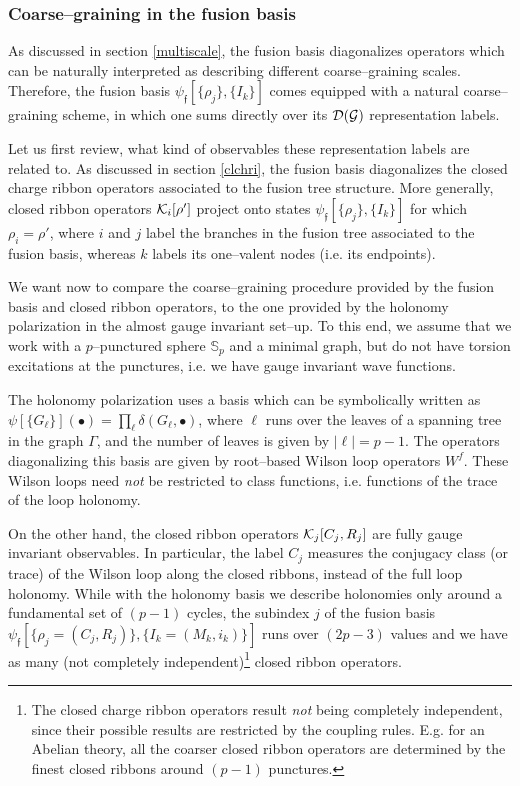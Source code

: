 \documentclass[nofootinbib,superscriptaddress,eqsecnum,tightenlines,11pt]{revtex4-1}
\def\mG{\mathcal{G}}
\renewcommand{\S}{{\mathbb S}}
\begin{document}
\subsubsection{Coarse--graining in the fusion basis}

 As discussed in section \ref{multiscale}, the fusion basis diagonalizes operators which can be naturally interpreted as describing different coarse--graining scales. 
Therefore, the fusion basis $\psi_{\mathfrak{f}}[\{\rho_j\},\{I_k\}]$ comes equipped with a natural coarse--graining scheme, in which one sums directly over its ${\cal D}(\mG)$ representation labels.

Let us first review, what kind of observables these representation labels are related to.  
As discussed in section \ref{clchri}, the fusion basis diagonalizes the closed charge ribbon operators associated to the fusion tree structure.
More generally, closed ribbon operators ${\cal K}_i[\rho']$ project onto states $\psi_{\mathfrak{f}}[\{\rho_j\},\{I_k\}]$ for which $\rho_i=\rho'$, where $i$ and $j$ label the branches in the fusion tree associated to the fusion basis, whereas $k$ labels its one--valent nodes (i.e. its endpoints).
 
We want now to compare the coarse--graining procedure provided by the fusion basis and closed ribbon operators, to the one provided by the holonomy polarization in the almost gauge invariant set--up.  
To this end, we assume that we work with a $p$--punctured sphere $\S_p$ and a minimal graph, but do not have torsion excitations at the punctures, i.e. we have gauge invariant wave functions. 

The holonomy polarization uses a basis which can be symbolically written as $\psi[\{G_\ell\}](\bullet)= \prod_\ell \delta(G_\ell, \bullet)$, where $\ell$ runs over the leaves of a spanning tree in the graph $\Gamma$, and the number of leaves is given by $|\ell|=p-1$.  
The operators diagonalizing this basis are given by root--based Wilson loop operators $W^f$.
These Wilson loops need \textit{not} be restricted to class functions, i.e. functions of the trace of the loop holonomy. 
 
On the other hand, the closed ribbon operators ${\cal K}_j[C_j,R_j]$ are fully gauge invariant observables. 
In particular, the label $C_j$ measures the conjugacy class (or trace) of the Wilson loop along the closed ribbons, instead of the full loop holonomy. 
While with the holonomy basis we describe holonomies only around a fundamental set of $(p-1)$ cycles, the  subindex $j$ of the fusion basis $\psi_{\mathfrak{f}}[\{\rho_j=(C_j,R_j)\},\{I_k=(M_k,i_k)\}]$ runs over  $(2p-3)$ values and we have as many (not completely independent)\footnote{The closed charge ribbon operators result \textit{not} being completely independent, since their possible results are restricted by the coupling rules. E.g. for an Abelian theory, all the coarser closed ribbon operators are determined by the finest closed ribbons around $(p-1)$ punctures.} closed ribbon operators. 
\end{document}
